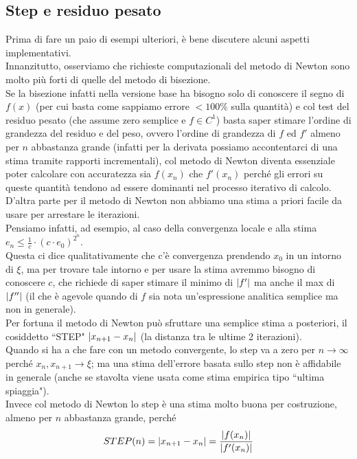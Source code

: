 \subsection{Step e residuo pesato}
Prima di fare un paio di esempi ulteriori, è bene discutere alcuni aspetti implementativi.\\
Innanzitutto, osserviamo che richieste computazionali del metodo di Newton sono molto più forti di quelle del metodo di bisezione.\\
Se la bisezione infatti nella versione base ha bisogno solo di conoscere il segno di $f(x)$ (per cui basta come sappiamo errore $< 100\%$ sulla quantità) e col test del residuo pesato (che assume zero semplice e $f \in C^1$) basta saper stimare l'ordine di grandezza del residuo e del peso, ovvero l'ordine di grandezza di $f$ ed $f'$ almeno per $n$ abbastanza grande (infatti per la derivata possiamo accontentarci di una stima tramite rapporti incrementali), col metodo di Newton diventa essenziale poter calcolare con accuratezza sia $f(x_n)$ che $f'(x_n)$ perché gli errori su queste quantità tendono ad essere dominanti nel processo iterativo di calcolo. \\
D'altra parte per il metodo di Newton non abbiamo una stima a priori facile da usare per arrestare le iterazioni.\\
Pensiamo infatti, ad esempio, al caso della convergenza locale e alla stima $e_n \leq \frac{1}{c} \cdot (c\cdot e_0)^{2^n}$.\\
Questa ci dice qualitativamente che c'è convergenza prendendo $x_0$ in un intorno di $\xi$, ma per trovare tale intorno e per usare la stima avremmo bisogno di conoscere $c$, che richiede di saper stimare il minimo di $\lvert f'\rvert$ ma anche il max di $\lvert f''\rvert$ (il che è agevole quando di $f$ sia nota un'espressione analitica semplice ma non in generale).\\
Per fortuna il metodo di Newton può sfruttare una semplice stima a posteriori, il cosiddetto ``STEP" $\lvert x_{n+1} - x_n\rvert$ (la distanza tra le ultime 2 iterazioni).\\
Quando si ha a che fare con un metodo convergente, lo step va a zero per $n \to \infty$ perché $x_n, x_{n+1} \to \xi$; ma una stima dell'errore basata sullo step non è affidabile in generale (anche se stavolta viene usata come stima empirica tipo ``ultima spiaggia").\\
Invece col metodo di Newton lo step è una stima molto buona per costruzione, almeno per $n$ abbastanza grande, perché
\[ STEP(n) = \lvert x_{n+1} - x_n\rvert = \frac{\lvert f(x_n)\rvert}{\lvert f'(x_n)\rvert} \]
